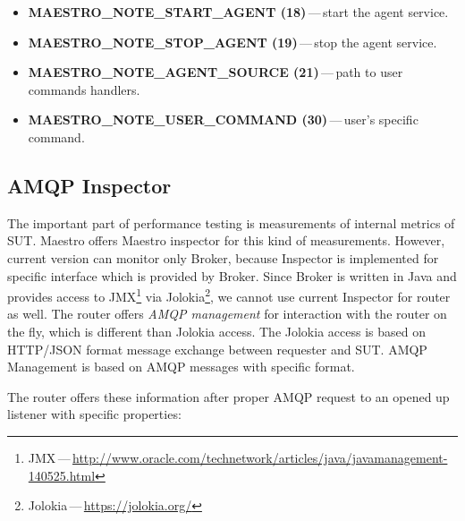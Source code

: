 \begin{itemize}
	\setlength\itemsep{0em}
	\item \textbf{MAESTRO\_NOTE\_START\_AGENT (18)}\,---\,start the agent service.
	\item \textbf{MAESTRO\_NOTE\_STOP\_AGENT (19)}\,---\,stop the agent service.
	\item \textbf{MAESTRO\_NOTE\_AGENT\_SOURCE (21)}\,---\,path to user commands handlers.
	\item \textbf{MAESTRO\_NOTE\_USER\_COMMAND (30)}\,---\,user's specific command.
\end{itemize}

\subsection{AMQP Inspector}
\label{AMQP Inspector}
The important part of performance testing is measurements of internal metrics of SUT. Maestro offers Maestro inspector for this kind of measurements. However, current version can monitor only Broker, because Inspector is implemented for specific interface which is provided by Broker. Since Broker is written in Java and provides access to JMX\footnote{JMX\,---\,\url{http://www.oracle.com/technetwork/articles/java/javamanagement-140525.html}} via Jolokia\footnote{Jolokia\,---\,\url{https://jolokia.org/}}, we cannot use current Inspector for router as well. The router offers \emph{AMQP management} for interaction with the router on the fly, which is different than Jolokia access. The Jolokia access is based on HTTP/JSON format message exchange between requester and SUT. AMQP Management is based on AMQP messages with specific format.

The router offers these information after proper AMQP request to an opened up listener with specific properties:

